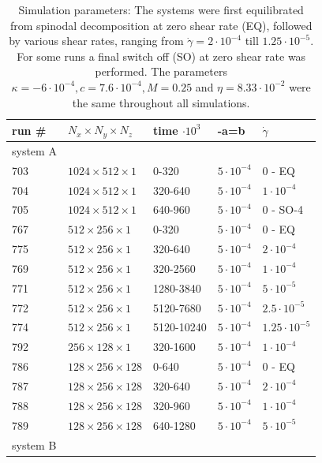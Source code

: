 \documentclass[8.5pt,twoside,twocolumn]{article}
\begin{document}
\begin{table}[htp!]
\small
\caption{Simulation parameters: The systems were first equilibrated from spinodal decomposition at zero shear rate (EQ), followed by various shear rates, ranging from $\dot{\gamma}=2\cdot10^{-4}$ till $1.25\cdot10^{-5}$. For some runs a final switch off (SO) at zero shear rate was performed. The parameters $\kappa=-6\cdot10^{-4}, c=7.6\cdot10^{-4}, M=0.25$ and $\eta=8.33\cdot10^{-2}$ were the same throughout all simulations.}
  \label{tab1}
  \begin{tabular*}{0.495\textwidth}{lllll}
\hline
run \# & $N_x\times N_y\times N_z$ & time $\cdot 10^3$ & -a=b &  $\dot\gamma$\\
\hline
system A & & & &\\
\hline 
703 & $1024\times512\times1$ & 0-320 & $5\cdot10^{-4}$ & 0 - EQ  \\
704 & $1024\times512\times1$ & 320-640& $5\cdot10^{-4}$ & $1\cdot10^{-4}$\\
705 & $1024\times512\times1$ & 640-960& $5\cdot10^{-4}$ & 0 - SO-4 \\
\hline
767 & $512\times256\times1$ & 0-320 & $5\cdot10^{-4}$  & 0 - EQ\\
775 & $512\times256\times1$ & 320-640& $5\cdot10^{-4}$ & $2\cdot 10^{-4}$ \\
769 & $512\times256\times1$ & 320-2560& $5\cdot10^{-4}$ & $1\cdot 10^{-4}$ \\
771 & $512\times256\times1$ & 1280-3840& $5\cdot10^{-4}$ & $ 5\cdot10^{-5}$ \\
772 & $512\times256\times1$ & 5120-7680& $5\cdot10^{-4}$ & $ 2.5\cdot10^{-5}$ \\
774 & $512\times256\times1$ & 5120-10240& $5\cdot10^{-4}$ & $1.25\cdot10^{-5}$ \\
\hline
792 & $256\times128\times1$ & 320-1600& $5\cdot10^{-4}$ & $1\cdot10^{-4}$ \\
\hline
786 & $128\times256\times128$ & 0-640 & $5\cdot10^{-4}$ & 0 - EQ\\
787 & $128\times256\times128$ & 320-640 & $5\cdot10^{-4}$ & $2\cdot 10^{-4}$\\
788 & $128\times256\times128$ & 320-960 & $5\cdot10^{-4}$ & $1\cdot 10^{-4}$\\
789 & $128\times256\times128$ & 640-1280 & $5\cdot10^{-4}$ & $5\cdot 10^{-5}$\\
\hline
system B & & & &\\

\end{tabular*}
\end{table}
\end{document}
